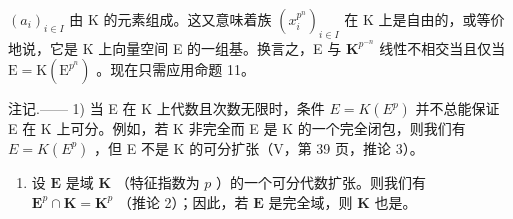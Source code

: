 \((a_{i})_{i\in I}\) 由 K 的元素组成。这又意味着族 \((x_{i}^{p^{n}})_{i\in I}\) 在 K 上是自由的，或等价地说，它是 K 上向量空间 E 的一组基。换言之，E 与 \(\mathbf{K}^{p^{-n}}\) 线性不相交当且仅当 \(\mathrm{E} = \mathrm{K}(\mathrm{E}^{p^n})\) 。现在只需应用命题 11。

注记.—— 1) 当 E 在 K 上代数且次数无限时，条件 \(E = K(E^{p})\) 并不总能保证 E 在 K 上可分。例如，若 K 非完全而 E 是 K 的一个完全闭包，则我们有 \(E = K(E^{p})\) ，但 E 不是 K 的可分扩张（V，第 39 页，推论 3）。

\begin{enumerate}
\def\labelenumi{\arabic{enumi})}
\setcounter{enumi}{1}
\tightlist
\item
  设 \(\mathbf{E}\) 是域 \(\mathbf{K}\) （特征指数为 \(p\) ）的一个可分代数扩张。则我们有 \(\mathbf{E}^p \cap \mathbf{K} = \mathbf{K}^p\) （推论 2）；因此，若 \(\mathbf{E}\) 是完全域，则 \(\mathbf{K}\) 也是。
\end{enumerate}

